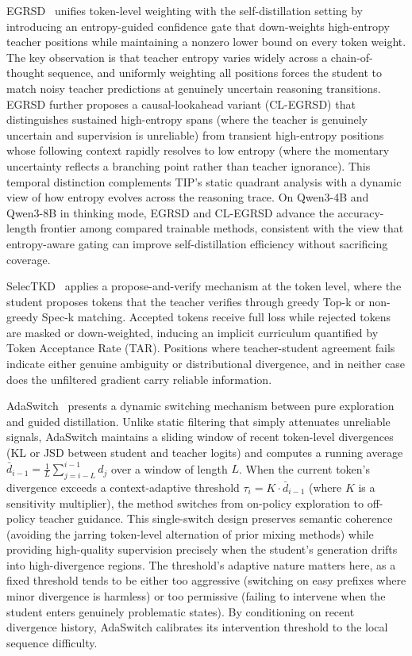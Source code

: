 \documentclass{article} %
\begin{document}
EGRSD~\citep{2605.13255} unifies token-level weighting with the self-distillation setting by introducing an entropy-guided confidence gate that down-weights high-entropy teacher positions while maintaining a nonzero lower bound on every token weight. The key observation is that teacher entropy varies widely across a chain-of-thought sequence, and uniformly weighting all positions forces the student to match noisy teacher predictions at genuinely uncertain reasoning transitions. EGRSD further proposes a causal-lookahead variant (CL-EGRSD) that distinguishes sustained high-entropy spans (where the teacher is genuinely uncertain and supervision is unreliable) from transient high-entropy positions whose following context rapidly resolves to low entropy (where the momentary uncertainty reflects a branching point rather than teacher ignorance). This temporal distinction complements TIP's static quadrant analysis with a dynamic view of how entropy evolves across the reasoning trace. On Qwen3-4B and Qwen3-8B in thinking mode, EGRSD and CL-EGRSD advance the accuracy-length frontier among compared trainable methods, consistent with the view that entropy-aware gating can improve self-distillation efficiency without sacrificing coverage.

SelecTKD~\citep{2510.24021} applies a propose-and-verify mechanism at the token level, where the student proposes tokens that the teacher verifies through greedy Top-k or non-greedy Spec-k matching. Accepted tokens receive full loss while rejected tokens are masked or down-weighted, inducing an implicit curriculum quantified by Token Acceptance Rate (TAR). Positions where teacher-student agreement fails indicate either genuine ambiguity or distributional divergence, and in neither case does the unfiltered gradient carry reliable information.

AdaSwitch~\citep{2510.07842} presents a dynamic switching mechanism between pure exploration and guided distillation. Unlike static filtering that simply attenuates unreliable signals, AdaSwitch maintains a sliding window of recent token-level divergences (KL or JSD between student and teacher logits) and computes a running average $\bar{d}_{i-1} = \frac{1}{L}\sum_{j=i-L}^{i-1} d_j$ over a window of length $L$. When the current token's divergence exceeds a context-adaptive threshold $\tau_i = K \cdot \bar{d}_{i-1}$ (where $K$ is a sensitivity multiplier), the method switches from on-policy exploration to off-policy teacher guidance. This single-switch design preserves semantic coherence (avoiding the jarring token-level alternation of prior mixing methods) while providing high-quality supervision precisely when the student's generation drifts into high-divergence regions. The threshold's adaptive nature matters here, as a fixed threshold tends to be either too aggressive (switching on easy prefixes where minor divergence is harmless) or too permissive (failing to intervene when the student enters genuinely problematic states). By conditioning on recent divergence history, AdaSwitch calibrates its intervention threshold to the local sequence difficulty.
\end{document}
